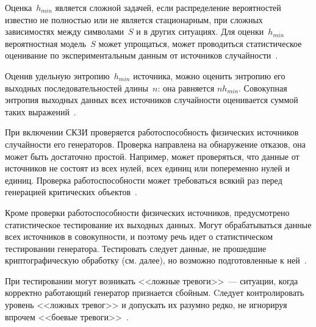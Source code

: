 Оценка~$h_{min}$ является сложной задачей, если распределение вероятностей 
известно не полностью или не является стационарным,
при сложных зависимостях между символами~$S$ и в других ситуациях.
%
Для оценки~$h_{min}$ вероятностная модель~$S$ может упрощаться,
может проводиться статистическое оценивание по экспериментальным
данным от источников случайности~.

Оценив удельную энтропию~$h_{min}$ источника, можно оценить 
энтропию его выходных последовательностей длины~$n$: она равняется 
$n h_{min}$. Совокупная энтропия выходных данных всех источников 
случайности оценивается суммой таких выражений~.

При включении СКЗИ проверяется работоспособность физических источников 
случайности его генераторов. Проверка направлена на обнаружение отказов, она 
может быть достаточно простой. Например, может проверяться, что данные от 
источников не состоят из всех нулей, всех единиц или попеременно нулей и 
единиц.
%
Проверка работоспособности может требоваться всякий раз перед генерацией 
критических объектов~.

Кроме проверки работоспособности физических источников, предусмотрено 
статистическое тестирование их выходных данных. Могут обрабатываться
данные всех источников в совокупности, и поэтому речь идет о статистическом 
тестировании генератора.
%
Тестировать следует данные, не прошедшие криптографическую обработку 
(см. далее), но возможно подготовленные к ней~.

При тестировании могут возникать <<ложные тревоги>>~--- ситуации, когда 
корректно работающий генератор признается сбойным. 
% 
Cледует контролировать уровень <<ложных тревог>> и допускать их разумно 
редко, не игнорируя впрочем <<боевые тревоги>>~. 
%

